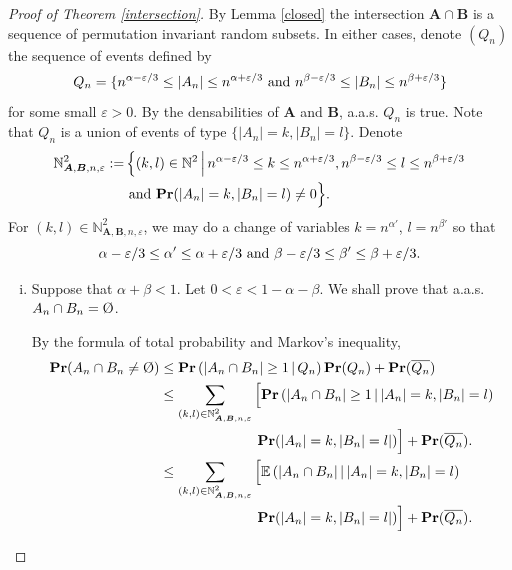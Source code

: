 \documentclass{article}
\newcommand{\vide}{\textup{\O}}
\newcommand{\bs}{\boldsymbol}
\def\Pr{\mathbf{Pr}}
\newcommand\esp[1]{\mathbb{E}\left( #1 \right)}
\theoremstyle{remark}
\begin{document}
\begin{proof}[Proof of Theorem \ref{intersection}]
    By Lemma \ref{closed} the intersection $\bs A\cap \bs B$ is a sequence of permutation invariant random subsets. In either cases, denote $(Q_n)$ the sequence of events defined by
    \[Q_n = \{n^{\alpha-\varepsilon/3}\leq|A_n|\leq n^{\alpha+\varepsilon/3}\textup{ and }n^{\beta-\varepsilon/3}\leq|B_n|\leq n^{\beta+\varepsilon/3}\}\] 
    for some small $\varepsilon>0$. By the densabilities of $\bs A$ and $\bs B$, a.a.s. $Q_n$ is true. Note that $Q_n$ is a union of events of type $\{|A_n|= k,|B_n| = l\}$. Denote 
    \[\begin{split}
        \mathbb{N}^2_{\bs A,\bs B, n, \varepsilon} := & \left\{ (k,l)\in \mathbb{N}^2 \,\middle|\, n^{\alpha-\varepsilon/3}\leq k \leq n^{\alpha+\varepsilon/3},n^{\beta-\varepsilon/3}\leq l \leq n^{\beta+\varepsilon/3} \right.\\
    & \textup{ and }\Pr(|A_n| = k,|B_n|=l)\neq 0 \Big\}.
    \end{split}\]
    For $(k,l)\in \mathbb{N}^2_{\bs A,\bs B, n, \varepsilon}$, we may do a change of variables $k = n^{\alpha'}$, $l = n^{\beta'}$ so that
        \[\alpha-\varepsilon/3\leq \alpha'\leq \alpha+\varepsilon/3\textup{ and }\beta-\varepsilon/3\leq \beta'\leq \beta+\varepsilon/3.\]
    
    \begin{enumerate}[(i)]
        \item Suppose that $\alpha +\beta<1$. Let $0<\varepsilon<1-\alpha-\beta$. We shall prove that a.a.s. $A_n\cap B_n=\vide$.
        
        By the formula of total probability and Markov's inequality,
        \[ \begin{split}
        \Pr(A_n\cap B_n\neq\vide) & \leq \Pr\left(|A_n \cap B_n|\geq 1\,\middle|\,Q_n\right)\Pr(Q_n)+\Pr(\overline{Q_n})\\
        & \leq \sum_{(k,l)\in\mathbb{N}^2_{\bs A,\bs B, n, \varepsilon}} \Big[ \Pr\left(|A_n \cap B_n|\geq 1\,\middle|\,|A_n|=k,|B_n| = l\right)\\
        &\qquad\qquad\qquad\quad\Pr(|A_n|=k,|B_n| = l|)\Big]+\Pr(\overline{Q_n}).\\        
        & \leq \sum_{(k,l)\in\mathbb{N}^2_{\bs A,\bs B, n, \varepsilon}} \Big[ \esp{|A_n \cap B_n|\,\middle|\,|A_n|=k,|B_n| = l}\\
        &\qquad\qquad\qquad\quad\Pr(|A_n|=k,|B_n| = l|)\Big]+\Pr(\overline{Q_n}).
        \end{split}\]
        

\end{enumerate}
\end{proof}
\end{document}
